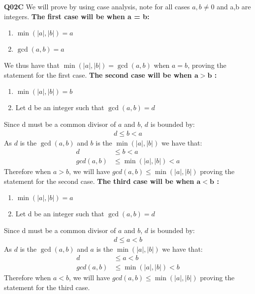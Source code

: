 \documentclass[11pt]{article}
\begin{document}
\textbf{Q02C} We will prove by using case analysis, note for all cases $a,b \neq 0$ and a,b are integers.
 \textbf{The first case will be when a  = b:}
\begin{enumerate}
\item $\min(|a|, |b|) = a$

\item$\gcd(a, b) = a$
\end{enumerate}
We thus have that $\min(|a|,|b|) = \gcd(a,b)$ when  $a=b$, proving the statement for the first case.
\textbf{The second case will be when $\pmb{a > b}$ :}

\begin{enumerate}
\item $\min(|a|, |b|) = b$

\item Let d be an integer such that $\gcd(a, b) = d$
\end{enumerate}

Since d must be a common divisor of $a$ and $ b$, $d$ is bounded by:
\begin{align*}
d \leq b < a
\end{align*}
As $d$ is the $\gcd(a,b)$ and $b$ is the $\min(|a|,|b|)$ we have that:
\begin{align*}
d &\leq b < a \\
gcd(a,b) &\leq \min(|a|,|b|) < a
\end{align*}
Therefore when $ a > b$, we will have $gcd(a,b) \leq \min(|a|,|b|)$ proving the statement for the second case.
\textbf{The third case will be when $\pmb{a < b}$ :}

\begin{enumerate}
\item $\min(|a|, |b|) = a$

\item Let d be an integer such that $\gcd(a, b) = d$
\end{enumerate}

Since d must be a common divisor of $a$ and $ b$, $d$ is bounded by:
\begin{align*}
d \leq a < b
\end{align*}
As $d$ is the $\gcd(a,b)$ and $a$ is the $\min(|a|,|b|)$ we have that:
\begin{align*}
d &\leq a < b \\
gcd(a,b) &\leq \min(|a|,|b|) < b
\end{align*}
Therefore when $ a < b$, we will have $gcd(a,b) \leq \min(|a|,|b|)$ proving the statement for the third case.
\end{document}
